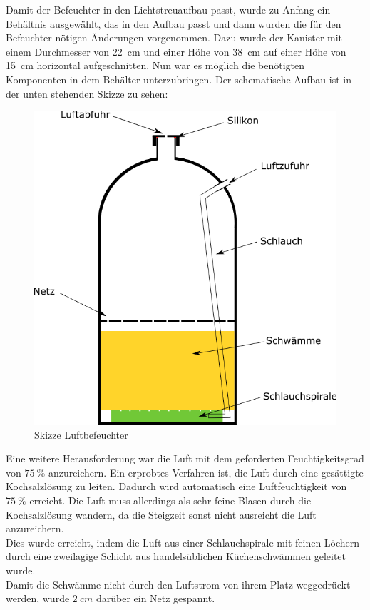 Damit der Befeuchter in den Lichtstreuaufbau passt, wurde zu Anfang ein Behältnis ausgewählt, das in den Aufbau passt und dann wurden die für den Befeuchter nötigen Änderungen vorgenommen. Dazu wurde der Kanister mit einem Durchmesser von \SI{22}{cm} und einer Höhe von \SI{38}{cm} auf einer Höhe von \SI{15}{cm} horizontal aufgeschnitten. Nun war es möglich die benötigten Komponenten in dem Behälter unterzubringen. Der schematische Aufbau ist in der unten stehenden Skizze zu sehen: \\

\begin{figure}[h]
	\begin{center}
		\includegraphics[scale=0.6]{Luftbefeuchter.png}
		\caption{Skizze Luftbefeuchter}
	\end{center}
\end{figure}

Eine weitere Herausforderung war die Luft mit dem geforderten Feuchtigkeitsgrad von $\SI{75}{\%}$ anzureichern. Ein erprobtes Verfahren ist, die Luft durch eine gesättigte Kochsalzlösung zu leiten. Dadurch wird automatisch eine Luftfeuchtigkeit von $\SI{75}{\%}$ erreicht. Die Luft muss allerdings als sehr feine Blasen durch die Kochsalzlösung wandern, da die Steigzeit sonst nicht ausreicht die Luft anzureichern. \\
Dies wurde erreicht, indem die Luft aus einer Schlauchspirale mit feinen Löchern durch eine zweilagige Schicht aus handelsüblichen Küchenschwämmen geleitet wurde. \\
Damit die Schwämme nicht durch den Luftstrom von ihrem Platz weggedrückt werden, wurde $\SI{2}{cm}$ darüber ein Netz gespannt.

